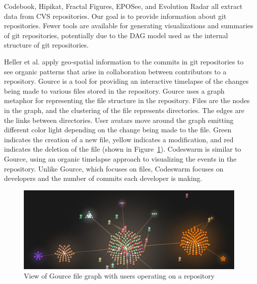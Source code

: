Codebook, Hipikat, Fractal Figures, EPOSee, and Evolution Radar all
extract data from CVS repositories. Our goal is to provide information
about git repositories. Fewer tools are available for generating
visualizations and summaries of git repositories, potentially due to the
DAG model used as the internal structure of git repositories.

Heller et al.\cite{Heller2011} apply geo-spatial information to the
commits in git repositories to see organic patterns that arise in
collaboration between contributors to a repository.
Gource\cite{Caudwell2010} is a tool for providing an interactive
timelapse of the changes being made to various files stored in the
repository. Gource uses a graph metaphor for representing the file
structure in the repository. Files are the nodes in the graph, and the
clustering of the file represents directories. The edges are the links
between directories. User avatars move around the graph emitting
different color light depending on the change being made to the file.
Green indicates the creation of a new file, yellow indicates a
modification, and red indicates the deletion of the file (shown in
Figure~\ref{fig:gource_view}). Codeswarm\cite{ogawa09} is similar to
Gource, using an organic timelapse approach to visualizing the events in
the repository. Unlike Gource, which focuses on files, Codeswarm focuses
on developers and the number of commits each developer is making.

\begin{figure}[htpb]
  \centering
  \includegraphics[width=0.8\linewidth]{./Figures/introduction/gource-linux.jpg}
  \caption{View of Gource file graph with users operating on a
    repository}
  \label{fig:gource_view}
\end{figure}

